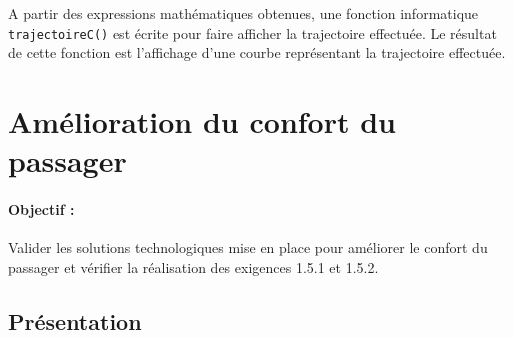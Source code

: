 A partir des expressions mathématiques obtenues, une fonction informatique \texttt{trajectoireC()} est écrite pour faire afficher la trajectoire effectuée. Le résultat de cette fonction est l'affichage d'une courbe représentant la trajectoire effectuée.


\section{Amélioration du confort du passager}

\paragraph{Objectif :} Valider les solutions technologiques mise en place pour améliorer le confort du passager et vérifier la réalisation des exigences 1.5.1 et 1.5.2.

\subsection{Présentation}

